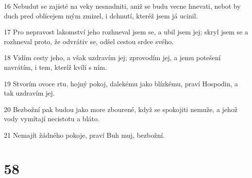 \par 16 Nebudut se zajisté na veky nesnadniti, aniž se budu vecne hnevati, nebot by duch pred oblícejem mým zmizel, i dchnutí, kteréž jsem já ucinil.
\par 17 Pro nepravost lakomství jeho rozhneval jsem se, a ubil jsem jej; skryl jsem se a rozhneval proto, že odvrátiv se, odšel cestou srdce svého.
\par 18 Vidím cesty jeho, a však uzdravím jej; zprovodím jej, a jemu potešení navrátím, i tem, kteríž kvílí s ním.
\par 19 Stvorím ovoce rtu, hojný pokoj, dalekému jako blízkému, praví Hospodin, a tak uzdravím jej.
\par 20 Bezbožní pak budou jako more zbourené, když se spokojiti nemuže, a jehož vody vymítají necistotu a bláto.
\par 21 Nemajít žádného pokoje, praví Buh muj, bezbožní.

\chapter{58}

